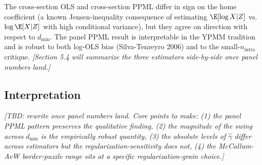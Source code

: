 The cross-section OLS and cross-section PPML differ in sign on the
home coefficient (a known Jensen-inequality consequence of estimating
$\E[\log X|Z]$ vs.\ $\log\E[X|Z]$ with high conditional variance), but
they agree on direction with respect to $d_{\min}$. The panel PPML
result is interpretable in the YPMM tradition and is robust to both
log-OLS bias (Silva-Tenreyro 2006) and to the small-$n_{\text{intra}}$
critique. \emph{[Section 5.4 will summarize the three estimators side-by-side
once panel numbers land.]}

\subsection{Interpretation}

\emph{[TBD: rewrite once panel numbers land. Core points to make:
(1) the panel PPML pattern preserves the qualitative finding,
(2) the magnitude of the swing across $d_{\min}$ is the empirically
robust quantity, (3) the absolute levels of $\hat{\gamma}$ differ
across estimators but the regularization-sensitivity does not,
(4) the McCallum-AvW border-puzzle range sits at a specific
regularization-grain choice.]}
